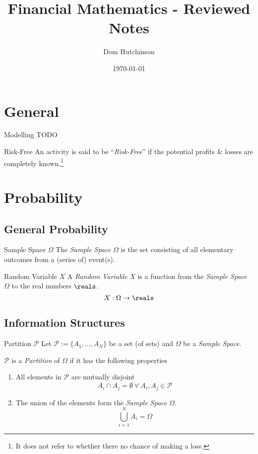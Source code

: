 \documentclass[11pt,a4paper]{article}
\begin{document}
\title{Financial Mathematics - Reviewed Notes}
\author{Dom Hutchinson}
\date{\today}
\maketitle

\tableofcontents\newpage

\section{General}\label{sec_general}

  \begin{definition}{Modelling}
    TODO
  \end{definition}

  \begin{definition}{Risk-Free}
    An activity is said to be ``\textit{Risk-Free}'' if the potential profits \& losses are completely known.\footnote{It does not refer to whether there no chance of making a loss.}
  \end{definition}

\section{Probability}\label{sec_probability}

\subsection{General Probability}

  \begin{definition}{Sample Space $\Omega$}
    The \textit{Sample Space} $\Omega$ is the set consisting of all elementary outcomes from a (series of) event(s).
  \end{definition}

  \begin{definition}{Random Variable $X$}
    A \textit{Random Variable} $X$ is a function from the \textit{Sample Space} $\Omega$ to the real numbers $\reals$.
    \[ X:\Omega\to\reals \]
  \end{definition}

\subsection{Information Structures}

  \begin{definition}{Partition $\mathcal{P}$}
    Let $\mathcal{P}:=\{A_1,\dots,A_N\}$ be a set (of sets) and $\Omega$ be a \textit{Sample Space}.
    \par $\mathcal{P}$ is a \textit{Partition} of $\Omega$ if it has the following properties
    \begin{enumerate}
      \item All elements in $\mathcal{P}$ are mutually disjoint
      \[ A_i\cap A_j=\emptyset\ \forall\ A_i,A_j\in\mathcal{P} \]
      \item The union of the elements form the \textit{Sample Space} $\Omega$.
      \[ \bigcup_{i=1}^NA_i=\Omega \]
    \end{enumerate}
  \end{definition}
\end{document}
